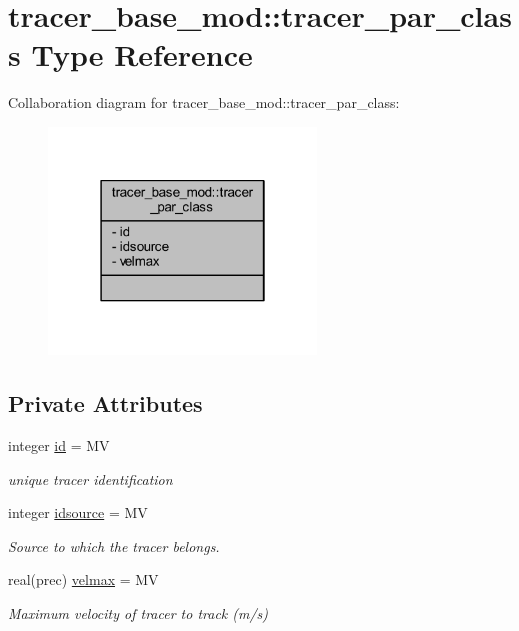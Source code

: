 \hypertarget{structtracer__base__mod_1_1tracer__par__class}{}\section{tracer\+\_\+base\+\_\+mod\+:\+:tracer\+\_\+par\+\_\+class Type Reference}
\label{structtracer__base__mod_1_1tracer__par__class}


Collaboration diagram for tracer\+\_\+base\+\_\+mod\+:\+:tracer\+\_\+par\+\_\+class\+:
\nopagebreak
\begin{figure}[H]
\begin{center}
\leavevmode
\includegraphics[width=202pt]{structtracer__base__mod_1_1tracer__par__class__coll__graph}
\end{center}
\end{figure}
\subsection*{Private Attributes}
\begin{DoxyCompactItemize}
\item 
integer \mbox{\hyperlink{structtracer__base__mod_1_1tracer__par__class_a659d37298b1c0a06c7627e33085eaf77}{id}} = MV
\begin{DoxyCompactList}\small\item\em unique tracer identification \end{DoxyCompactList}\item 
integer \mbox{\hyperlink{structtracer__base__mod_1_1tracer__par__class_ad8fa9b92761b2a1f833d77c48adbb2b3}{idsource}} = MV
\begin{DoxyCompactList}\small\item\em Source to which the tracer belongs. \end{DoxyCompactList}\item 
real(prec) \mbox{\hyperlink{structtracer__base__mod_1_1tracer__par__class_a58ad740d66f1c65d200ad7bd22fbcb77}{velmax}} = MV
\begin{DoxyCompactList}\small\item\em Maximum velocity of tracer to track (m/s) \end{DoxyCompactList}\end{DoxyCompactItemize}


